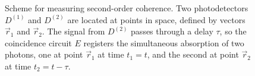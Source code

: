 \begin{figure}
\centering



\caption{Scheme for measuring second-order coherence. Two
  photodetectors $D^{(1)}$ and $D^{(2)}$ are located at points in space,
  defined by vectors $\vec{r}_1$ and $\vec{r}_2$. The signal from $D^{(2)}$
passes through a delay $\tau$, so the coincidence circuit $E$
registers the simultaneous absorption of two photons, one at point
$\vec{r}_1$ at time $t_1 = t$, and the second at point
$\vec{r}_2$ at time $t_2 = t - \tau$.}
\label{figPart4Ch2_add1}
\end{figure}